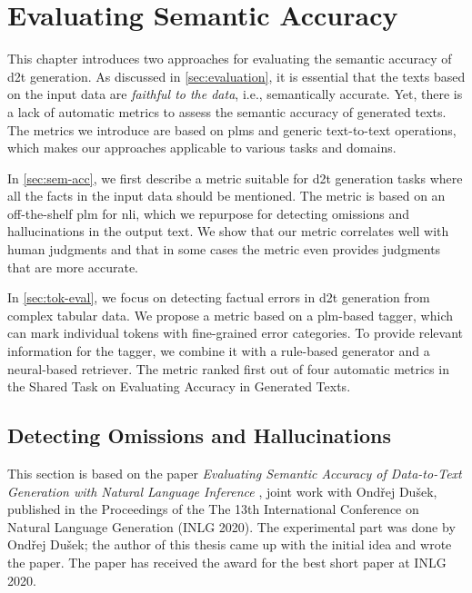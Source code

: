 
\chapter{Evaluating Semantic Accuracy}
\label{chap:evaluation}


This chapter introduces two approaches for evaluating the semantic accuracy of \ac{d2t} generation. As discussed in \autoref{sec:evaluation}, it is essential that the texts based on the input data are \emph{faithful to the data}, i.e., semantically accurate. Yet, there is a lack of automatic metrics to assess the semantic accuracy of generated texts. The metrics we introduce are based on \acp{plm} and generic text-to-text operations, which makes our approaches applicable to various tasks and domains.

In \autoref{sec:sem-acc}, we first describe a metric suitable for \ac{d2t} generation tasks where all the facts in the input data should be mentioned. The metric is based on an off-the-shelf \ac{plm} for \ac{nli}, which we repurpose for detecting omissions and hallucinations in the output text. We show that our metric correlates well with human judgments and that in some cases the metric even provides judgments that are more accurate.

In \autoref{sec:tok-eval}, we focus on detecting factual errors in \ac{d2t} generation from complex tabular data. We propose a metric based on a \ac{plm}-based tagger, which can mark individual tokens with fine-grained error categories. To provide relevant information for the tagger, we combine it with a rule-based generator and a neural-based retriever. The metric ranked first out of four automatic metrics in the Shared Task on Evaluating Accuracy in Generated Texts.

\section{Detecting Omissions and Hallucinations}
\label{sec:sem-acc}

\begin{refbox}
    This section is based on the paper \emph{Evaluating Semantic Accuracy of Data-to-Text Generation with Natural Language Inference} \cite{dusekEvaluatingSemanticAccuracy2020}, joint work with Ondřej Dušek, published in the Proceedings of the The 13th International Conference on Natural Language Generation (INLG 2020). The experimental part was done by Ondřej Dušek; the author of this thesis came up with the initial idea and wrote the paper. The paper has received the award for the best short paper at INLG 2020.
\end{refbox}

